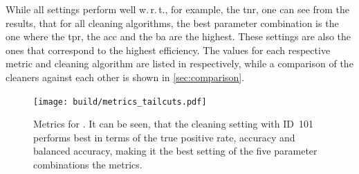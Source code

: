 While all settings perform well w.\,r.\,t., for example, the \gls{tnr}, one can see from the results, that for all cleaning
algorithms, the best parameter combination is the one where the \gls{tpr}, the \gls{acc} and the \gls{ba}
are the highest. These settings are also the ones that correspond to the highest efficiency.
The values for each respective metric and cleaning algorithm are listed in
 respectively, while
a comparison of the cleaners against each other is shown in \autoref{sec:comparison}.
\begin{table}
    \centering
    \caption{Results for the metrics of \tailcuts{}. One can see, that the best results are obtained
    for the setting with ID~101.}
    \label{tab:metrics_tail}
\end{table}

\begin{figure}
    \centering
    \texttt{[image: build/metrics\_tailcuts.pdf]}
    \caption{Metrics for \tailcuts{}. It can be seen, that the cleaning setting with ID~101 performs
    best in terms of the true positive rate, accuracy and balanced accuracy, making it the best
    setting of the five parameter combinations \wrt the metrics.}
    \label{fig:metrics_tail}
\end{figure}

